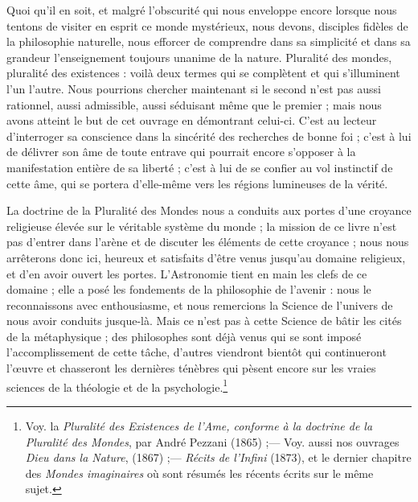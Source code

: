 \documentclass[a4paper, 11pt, oneside]{article}
\begin{document}
Quoi qu'il en soit, et malgré l'obscurité qui nous enveloppe encore lorsque nous tentons de visiter en esprit ce monde mystérieux, nous devons, disciples fidèles de la philosophie naturelle, nous efforcer de comprendre dans sa simplicité et dans sa grandeur l'enseignement toujours unanime de la nature. Pluralité des mondes, pluralité des existences : voilà deux termes qui se complètent et qui s'illuminent l'un l'autre. Nous pourrions chercher maintenant si le second n'est pas aussi rationnel, aussi admissible, aussi séduisant même que le premier ; mais nous avons atteint le but de cet ouvrage en démontrant celui-ci. C'est au lecteur d'interroger sa conscience dans la sincérité des recherches de bonne foi ; c'est à lui de délivrer son âme de toute entrave qui pourrait encore s'opposer à la manifestation entière de sa liberté ; c'est à lui de se confier au vol instinctif de cette âme, qui se portera d'elle-même vers les régions lumineuses de la vérité.

La doctrine de la Pluralité des Mondes nous a conduits aux portes d'une croyance religieuse élevée sur le véritable système du monde ; la mission de ce livre n'est pas d'entrer dans l'arène et de discuter les éléments de cette croyance ; nous nous arrêterons donc ici, heureux et satisfaits d'être venus jusqu'au domaine religieux, et d'en avoir ouvert les portes. L'Astronomie tient en main les clefs de ce domaine ; elle a posé les fondements de la philosophie de l'avenir : nous le reconnaissons avec enthousiasme, et nous remercions la Science de l'univers de nous avoir conduits jusque-là. Mais ce n'est pas à cette Science de bâtir les cités de la métaphysique ; des philosophes sont déjà venus qui se sont imposé l'accomplissement de cette tâche, d'autres viendront bientôt qui continueront l'œuvre et chasseront les dernières ténèbres qui pèsent encore sur les vraies sciences de la théologie et de la psychologie.\footnote{Voy. la \emph{Pluralité des Existences de l'Ame, conforme à la doctrine de la Pluralité des Mondes}, par André Pezzani (1865) ;--- Voy. aussi nos ouvrages \emph{Dieu dans la Nature}, (1867) ;--- \emph{Récits de l'Infini} (1873), et le dernier chapitre des \emph{Mondes imaginaires} où sont résumés les récents écrits sur le même sujet.}
\end{document}
